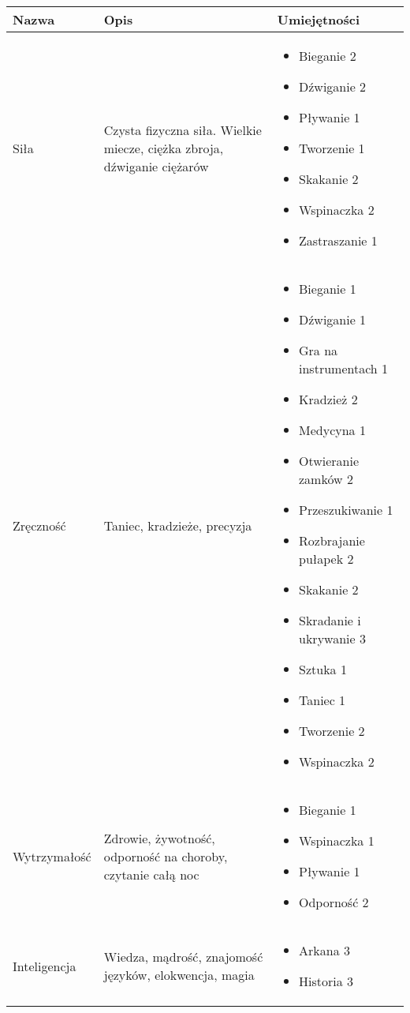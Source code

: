 \begin{longtable}[c]{m{}m{}m{}}
	Nazwa        & Opis & Umiejętności \\* \midrule
	\endhead
	\endfoot
	\endlastfoot
	Siła &
	Czysta fizyczna siła. Wielkie miecze, ciężka zbroja, dźwiganie ciężarów &
	\begin{itemize}
		\item Bieganie 2
		\item Dźwiganie 2
		\item Pływanie 1
		\item Tworzenie 1
		\item Skakanie 2
		\item Wspinaczka 2
		\item Zastraszanie 1
	\end{itemize} \\ \midrule
	Zręczność &
	Taniec, kradzieże, precyzja &
	\begin{itemize}
		\item Bieganie 1
		\item Dźwiganie 1
		\item Gra na instrumentach 1
		\item Kradzież 2
		\item Medycyna 1
		\item Otwieranie zamków 2
		\item Przeszukiwanie 1
		\item Rozbrajanie pułapek 2
		\item Skakanie 2
		\item Skradanie i ukrywanie 3
		\item Sztuka 1
		\item Taniec 1
		\item Tworzenie 2
		\item Wspinaczka 2
	\end{itemize}\\\midrule
	Wytrzymałość &
	Zdrowie, żywotność, odporność na choroby, czytanie całą noc &
	\begin{itemize}
		\item Bieganie 1
		\item Wspinaczka 1
		\item Pływanie 1
		\item Odporność 2
	\end{itemize}\\ \midrule
	Inteligencja &
	Wiedza, mądrość, znajomość języków, elokwencja, magia &
	\begin{itemize}
		\item Arkana 3
		\item Historia 3

\end{itemize}
\end{longtable}

